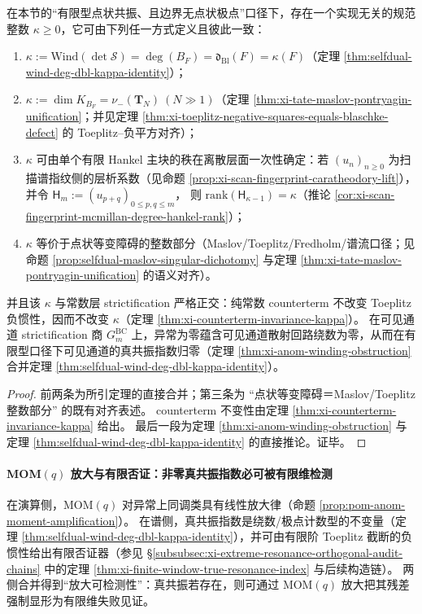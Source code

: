 \begin{corollary}\label{cor:xi-kappa-invariant-unification}
在本节的“有限型点状共振、且边界无点状极点”口径下，存在一个实现无关的规范整数 \(\kappa\ge 0\)，它可由下列任一方式定义且彼此一致：
\begin{enumerate}
  \item \(\kappa:=\mathrm{Wind}(\det\mathcal S)=\deg(B_F)=\mathfrak d_{\mathrm{Bl}}(F)=\kappa(F)\)（定理 \ref{thm:selfdual-wind-deg-dbl-kappa-identity}）；
  \item \(\kappa:=\dim K_{B_F}=\nu_-(\mathbf{T}_N)\ (N\gg 1)\)（定理 \ref{thm:xi-tate-maslov-pontryagin-unification}；并见定理 \ref{thm:xi-toeplitz-negative-squares-equals-blaschke-defect} 的 Toeplitz--负平方对齐）；
  \item \(\kappa\) 可由单个有限 Hankel 主块的秩在离散层面一次性确定：若 \((u_n)_{n\ge 0}\) 为扫描谱指纹侧的层析系数（见命题 \ref{prop:xi-scan-fingerprint-caratheodory-lift}），并令
  \(\mathsf{H}_m:=(u_{p+q})_{0\le p,q\le m}\)，
  则 \(\mathrm{rank}(\mathsf{H}_{\kappa-1})=\kappa\)（推论 \ref{cor:xi-scan-fingerprint-mcmillan-degree-hankel-rank}）；
  \item \(\kappa\) 等价于点状等变障碍的整数部分（Maslov/Toeplitz/Fredholm/谱流口径；见命题 \ref{prop:selfdual-maslov-singular-dichotomy} 与定理 \ref{thm:xi-tate-maslov-pontryagin-unification} 的语义对齐）。
\end{enumerate}
并且该 \(\kappa\) 与常数层 strictification 严格正交：纯常数 counterterm 不改变 Toeplitz 负惯性，因而不改变 \(\kappa\)（定理 \ref{thm:xi-counterterm-invariance-kappa}）。
在可见通道 strictification 商 \(G^{\mathrm{BC}}_m\) 上，异常为零蕴含可见通道散射回路绕数为零，从而在有限型口径下可见通道的真共振指数归零（定理 \ref{thm:xi-anom-winding-obstruction} 合并定理 \ref{thm:selfdual-wind-deg-dbl-kappa-identity}）。
\end{corollary}
\begin{proof}
前两条为所引定理的直接合并；第三条为 “点状等变障碍＝Maslov/Toeplitz 整数部分” 的既有对齐表述。
counterterm 不变性由定理 \ref{thm:xi-counterterm-invariance-kappa} 给出。
最后一段为定理 \ref{thm:xi-anom-winding-obstruction} 与定理 \ref{thm:selfdual-wind-deg-dbl-kappa-identity} 的直接推论。证毕。
\end{proof}

\paragraph{MOM\texorpdfstring{$(q)$}{(q)} 放大与有限否证：非零真共振指数必可被有限维检测}
在演算侧，MOM\((q)\) 对异常上同调类具有线性放大律（命题 \ref{prop:pom-anom-moment-amplification}）。
在谱侧，真共振指数是绕数/极点计数型的不变量（定理 \ref{thm:selfdual-wind-deg-dbl-kappa-identity}），并可由有限阶 Toeplitz 截断的负惯性给出有限否证器（参见 \S\ref{subsubsec:xi-extreme-resonance-orthogonal-audit-chains} 中的定理 \ref{thm:xi-finite-window-true-resonance-index} 与后续构造链）。
两侧合并得到“放大可检测性”：真共振若存在，则可通过 MOM\((q)\) 放大把其残差强制显形为有限维失败见证。

